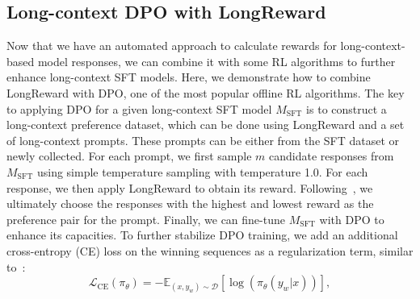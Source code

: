 \subsection{Long-context DPO with LongReward}
\label{sec:longreward+dpo}
Now that we have an automated approach to calculate rewards for long-context-based model responses, we can combine it with some RL algorithms to further enhance long-context SFT models. Here, we demonstrate how to combine LongReward with DPO, one of the most popular offline RL algorithms. The key to applying DPO for a given long-context SFT model $M_\text{SFT}$ is to construct a long-context preference dataset, which can be done using LongReward and a set of long-context prompts.  
These prompts can be either from the SFT dataset or newly collected. For each prompt, we first sample $m$ candidate responses from $M_\text{SFT}$ using simple temperature sampling with temperature 1.0. For each response, we then apply LongReward to obtain its reward. Following~\cite{chatglm-rlhf}, we ultimately choose the responses with the highest and lowest reward as the preference pair for the prompt. Finally, we can fine-tune $M_\text{SFT}$ with DPO to enhance its capacities. To further stabilize DPO training, we add an additional cross-entropy (CE) loss on the winning sequences as a regularization term, similar to~\cite{pan2024}: 
\begin{equation}
\mathcal{L}_\text{CE}(\pi_\theta)= -\mathbb{E}_{(x, y_w)\sim\mathcal{D}}[\log(\pi_\theta(y_w|x))],
\end{equation}

